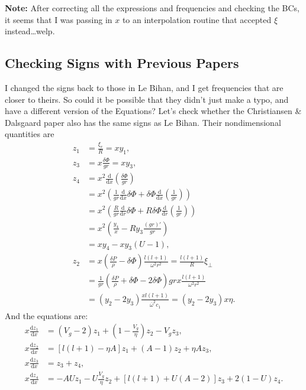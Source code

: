 \documentclass[11pt,
        usenames, %
        twocolumn,
        landscape,
        dvipsnames %
    ]{article}
\newcommand*{\rd}[2]{\frac{\mathrm{d}#1}{\mathrm{d}#2}}
\newcommand*{\p}[1]{\left(#1\right)}
\newcommand*{\s}[1]{\left[#1\right]}
\begin{document}
\textbf{Note:} After correcting all the expressions and frequencies and checking
the BCs, it seems that I was passing in $x$ to an interpolation routine that
accepted $\xi$ instead\dots welp.

\subsection{Checking Signs with Previous Papers}

I changed the signs back to those in Le Bihan, and I get frequencies that are
closer to theirs. So could it be possible that they didn't just make a typo, and
have a different version of the Equations? Let's check whether the Christiansen
\& Dalsgaard paper also has the same signs as Le Bihan. Their nondimensional
quantities are
\begin{align}
    z_1 &= \frac{\xi_r}{R} = xy_1,\\
    z_3 &= x\frac{\delta \Phi}{gr} = xy_3,\\
    z_4 &= x^2\rd{}{x}\p{\frac{\delta \Phi}{gr}}\nonumber\\
        &= x^2\p{\frac{1}{gr}\rd{}{x}\delta \Phi
            + \delta \Phi \rd{}{x}\p{\frac{1}{gr}}}\nonumber\\
        &= x^2\p{\frac{R}{gr}\rd{}{r}\delta \Phi
            + R\delta \Phi \rd{}{r}\p{\frac{1}{gr}}}\nonumber\\
        &= x^2\p{\frac{y_4}{x}
            - Ry_3 \frac{(gr)'}{gr}}\nonumber\\
        &= xy_4 - xy_3 (U - 1),\\
    z_2 &= x\p{\frac{\delta P}{\rho} - \delta \Phi}\frac{l(l + 1)}{\omega^2r^2}
            = \frac{l(l+1)}{R}\xi_\perp\nonumber\\
        &= \frac{1}{gr}\p{\frac{\delta P}{\rho} + \delta \Phi - 2\delta \Phi}
            grx\frac{l(l + 1)}{\omega^2r^2}
            \nonumber\\
        &= \p{y_2 - 2y_3}\frac{xl(l+1)}{\bar{\omega}^2c_1}
        = \p{y_2 - 2y_3}x\eta.
\end{align}
And the equations are:
\begin{align}
    x\rd{z_1}{x} &= \p{V_g - 2} z_1 + \p{1 - \frac{V_g}{\eta}} z_2
        - V_gz_3,\\
    x\rd{z_2}{x} &= \s{l(l+1) - \eta A}z_1 + (A - 1)z_2 + \eta Az_3,\\
    x\rd{z_3}{x} &= z_3 + z_4,\\
    x\rd{z_4}{x} &= -AUz_1 - U\frac{V_g}{\eta}z_2
        + \s{l(l+1) + U(A - 2)}z_3
        + 2\p{1 - U}z_4.
\end{align}
\end{document}
